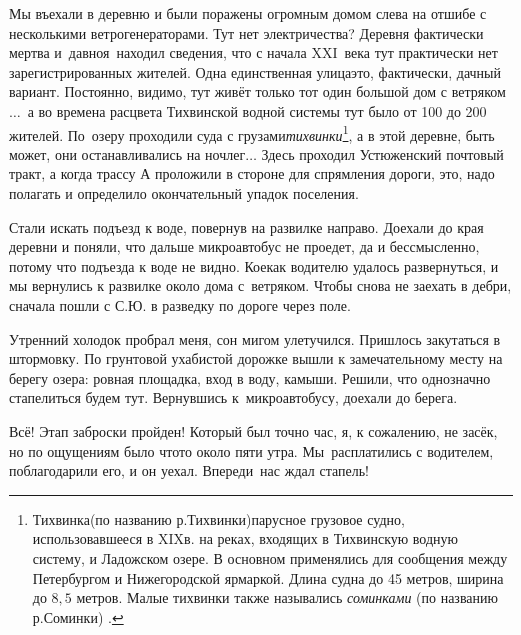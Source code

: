 Мы въехали в деревню и были поражены огромным домом слева на отшибе с несколькими ветрогенераторами. Тут нет электричества? Деревня фактически мертва и~давно\mdash я~находил сведения, что с начала XXI~века тут практически нет зарегистрированных жителей. Одна единственная улица\mdash это, фактически, дачный вариант. Постоянно, видимо, тут живёт только тот один большой дом с ветряком$\ldots$~а во времена расцвета Тихвинской водной системы тут было от 100 до 200 жителей. По~озеру проходили суда с грузами\mdash \textit{тихвинки}\footnote[1]{Тихвинка\thinspace(по названию р.\thinspace Тихвинки)\mdash парусное грузовое судно, использовавшееся в XIX\thinspace в. на реках, входящих в Тихвинскую водную систему, и Ладожском озере. В основном применялись для сообщения между Петербургом и Нижегородской ярмаркой. Длина судна до 45 метров, ширина до $8,5$ метров. Малые тихвинки также назывались \textit{соминками} (по названию р.\thinspace Соминки) \cite{МорскойСправочник}.}, а в этой деревне, быть может, они останавливались на ночлег$\ldots$ Здесь проходил Устюженский почтовый тракт, а когда трассу А проложили в стороне для спрямления дороги, это, надо полагать и определило окончательный упадок поселения.

Стали искать подъезд к воде, повернув на развилке направо. Доехали до края деревни и поняли, что дальше микроавтобус не проедет, да и бессмысленно, потому что подъезда к воде не видно. Кое\sdash как водителю удалось развернуться, и мы вернулись к развилке около дома с~ветряком. Чтобы снова не заехать в дебри, сначала пошли с С.Ю. в разведку по дороге через поле. 

Утренний холодок пробрал меня, сон мигом улетучился. Пришлось закутаться в штормовку. По грунтовой ухабистой дорожке вышли к замечательному месту на берегу озера: ровная площадка, вход в воду, камыши. Решили, что однозначно стапелиться будем тут. Вернувшись к~микроавтобусу, доехали до берега. 

Всё! Этап заброски пройден! Который был точно час, я, к сожалению, не засёк, но по ощущениям было что\sdash то около пяти утра. Мы~расплатились с водителем, поблагодарили его, и он уехал. Впереди~нас ждал стапель!

\begin{center}
\end{center}
